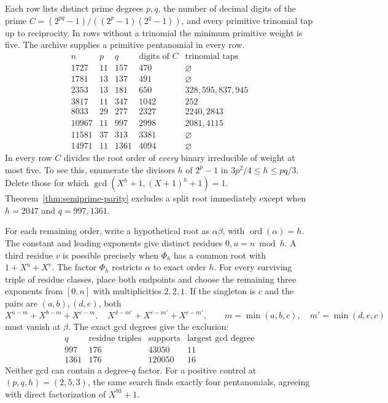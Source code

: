 \documentclass[11pt]{article}
\newcommand{\ord}{\operatorname{ord}}
\begin{document}
Each row lists distinct prime degrees \(p,q\), the number of decimal
digits of the prime \(C=(2^{pq}-1)/((2^p-1)(2^q-1))\), and every
primitive trinomial tap up to reciprocity. In rows without a
trinomial the minimum primitive weight is five. The archive supplies
a primitive pentanomial in every row.
\[
\begin{array}{r|r|r|r|l}
 n&p&q&\text{digits of }C&\text{trinomial taps}\\\hline
 1727&11&157&470&\varnothing\\
 1781&13&137&491&\varnothing\\
 2353&13&181&650&328,595,837,945\\
 3817&11&347&1042&252\\
 8033&29&277&2327&2240,2843\\
 10967&11&997&2998&2081,4115\\
 11581&37&313&3381&\varnothing\\
 14971&11&1361&4094&\varnothing
\end{array}
\]
In every row \(C\) divides the root order of \emph{every} binary
irreducible of weight at most five. To see this, enumerate the divisors
\(h\) of \(2^p-1\) in \(3p^2/4\le h\le pq/3\). Delete those for which
\(\gcd(X^h+1,(X+1)^h+1)=1\). Theorem~\ref{thm:semiprime-parity}
excludes a split root immediately except when \(h=2047\) and
\(q=997,1361\).

For each remaining order, write a hypothetical root as
\(\alpha\beta\), with \(\ord(\alpha)=h\). The constant and leading
exponents give distinct residues \(0,u=n\bmod h\). A third residue
\(v\) is possible precisely when \(\Phi_h\) has a common root with
\(1+X^u+X^v\). The factor \(\Phi_h\) restricts \(\alpha\) to exact
order \(h\). For every surviving triple of residue classes, place
both endpoints and choose the remaining three exponents from
\([0,n]\) with multiplicities \(2,2,1\). If the singleton is \(c\)
and the pairs are \((a,b),(d,e)\), both
\[
 X^{a-m}+X^{b-m}+X^{c-m},\quad
 X^{d-m'}+X^{e-m'}+X^{c-m'},\qquad
 m=\min(a,b,c),\quad m'=\min(d,e,c)
\]
must vanish at \(\beta\). The exact gcd degrees give the exclusion:
\[
\begin{array}{r|r|r|r}
 q&\text{residue triples}&\text{supports}&\text{largest gcd degree}\\\hline
 997&176&43050&11\\
 1361&176&120050&16
\end{array}
\]
Neither gcd can contain a degree-\(q\) factor. For a positive control
at \((p,q,h)=(2,5,3)\), the same search finds exactly four
pentanomials, agreeing with direct factorization of \(X^{93}+1\).
\end{document}
